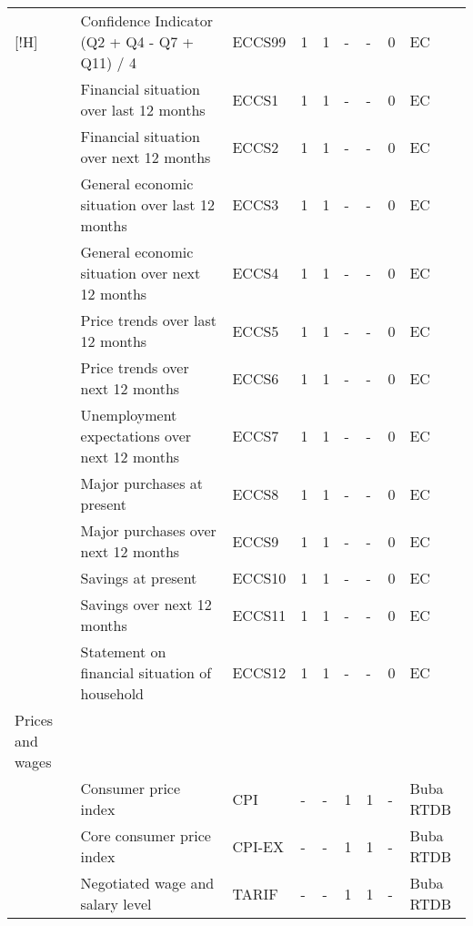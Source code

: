 \documentclass[10pt]{article}
\begin{document}
\begin{footnotesize}
\begin{longtable}{p{1in}|p{2.5in}|p{1in}|p{.1in}|p{.1in}|p{.1in}|p{.15in}|p{.1in}|p{.5in}}[!H]
 & {\tiny{}Confidence Indicator (Q2 + Q4 - Q7 + Q11) / 4 } & {\tiny{}ECCS99} & {\tiny{}1} & {\tiny{}1} & {\tiny{}-} & {\tiny{}-} & {\tiny{}0} & {\tiny{}EC}\tabularnewline
 & {\tiny{}Financial situation over last 12 months} & {\tiny{}ECCS1} & {\tiny{}1} & {\tiny{}1} & {\tiny{}-} & {\tiny{}-} & {\tiny{}0} & {\tiny{}EC}\tabularnewline
 & {\tiny{}Financial situation over next 12 months} & {\tiny{}ECCS2} & {\tiny{}1} & {\tiny{}1} & {\tiny{}-} & {\tiny{}-} & {\tiny{}0} & {\tiny{}EC}\tabularnewline
 & {\tiny{}General economic situation over last 12 months} & {\tiny{}ECCS3} & {\tiny{}1} & {\tiny{}1} & {\tiny{}-} & {\tiny{}-} & {\tiny{}0} & {\tiny{}EC}\tabularnewline
 & {\tiny{}General economic situation over next 12 months} & {\tiny{}ECCS4} & {\tiny{}1} & {\tiny{}1} & {\tiny{}-} & {\tiny{}-} & {\tiny{}0} & {\tiny{}EC}\tabularnewline
 & {\tiny{}Price trends over last 12 months} & {\tiny{}ECCS5} & {\tiny{}1} & {\tiny{}1} & {\tiny{}-} & {\tiny{}-} & {\tiny{}0} & {\tiny{}EC}\tabularnewline
 & {\tiny{}Price trends over next 12 months} & {\tiny{}ECCS6} & {\tiny{}1} & {\tiny{}1} & {\tiny{}-} & {\tiny{}-} & {\tiny{}0} & {\tiny{}EC}\tabularnewline
 & {\tiny{}Unemployment expectations over next 12 months} & {\tiny{}ECCS7} & {\tiny{}1} & {\tiny{}1} & {\tiny{}-} & {\tiny{}-} & {\tiny{}0} & {\tiny{}EC}\tabularnewline
 & {\tiny{}Major purchases at present} & {\tiny{}ECCS8} & {\tiny{}1} & {\tiny{}1} & {\tiny{}-} & {\tiny{}-} & {\tiny{}0} & {\tiny{}EC}\tabularnewline
 & {\tiny{}Major purchases over next 12 months} & {\tiny{}ECCS9} & {\tiny{}1} & {\tiny{}1} & {\tiny{}-} & {\tiny{}-} & {\tiny{}0} & {\tiny{}EC}\tabularnewline
 & {\tiny{}Savings at present} & {\tiny{}ECCS10} & {\tiny{}1} & {\tiny{}1} & {\tiny{}-} & {\tiny{}-} & {\tiny{}0} & {\tiny{}EC}\tabularnewline
 & {\tiny{}Savings over next 12 months} & {\tiny{}ECCS11} & {\tiny{}1} & {\tiny{}1} & {\tiny{}-} & {\tiny{}-} & {\tiny{}0} & {\tiny{}EC}\tabularnewline
 & {\tiny{}Statement on financial situation of household} & {\tiny{}ECCS12} & {\tiny{}1} & {\tiny{}1} & {\tiny{}-} & {\tiny{}-} & {\tiny{}0} & {\tiny{}EC}\tabularnewline
{\tiny{}Prices and wages} &  &  &  &  &  &  &  & \tabularnewline
 & {\tiny{}Consumer price index} & {\tiny{}CPI} & {\tiny{}-} & {\tiny{}-} & {\tiny{}1} & {\tiny{}1} & {\tiny{}-} & {\tiny{}Buba RTDB}\tabularnewline
 & {\tiny{}Core consumer price index} & {\tiny{}CPI-EX} & {\tiny{}-} & {\tiny{}-} & {\tiny{}1} & {\tiny{}1} & {\tiny{}-} & {\tiny{}Buba RTDB}\tabularnewline
 & {\tiny{}Negotiated wage and salary level} & {\tiny{}TARIF} & {\tiny{}-} & {\tiny{}-} & {\tiny{}1} & {\tiny{}1} & {\tiny{}-} & {\tiny{}Buba RTDB}\tabularnewline

\end{longtable}
\end{footnotesize}
\end{document}
